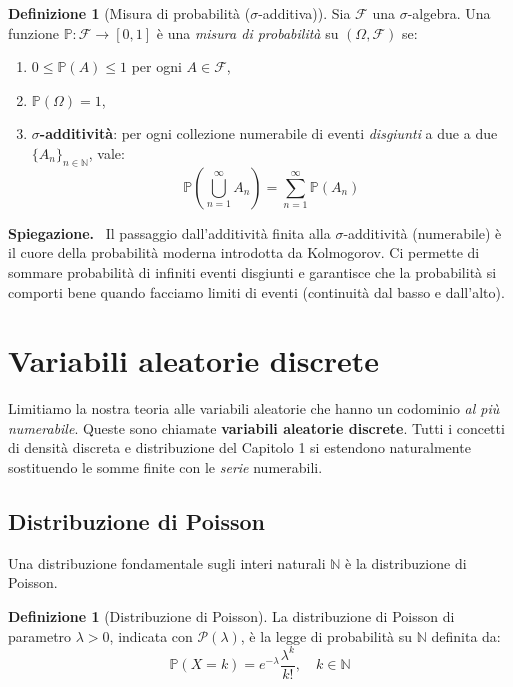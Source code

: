 \documentclass[11pt, a4paper]{report}
\theoremstyle{plain}
\theoremstyle{definition}
\newtheorem{definition}[theorem]{Definizione}
\theoremstyle{remark}
\newenvironment{spiegazione}[1][Spiegazione]
{\begin{mdframed}[backgroundcolor=green!5, linecolor=green!50, linewidth=2pt, topline=false, rightline=false, bottomline=false]
\textbf{\textsf{#1.}}\ }
{\end{mdframed}}
\newcommand{\PP}{\mathbb{P}}
\newcommand{\F}{\mathcal{F}}
\newcommand{\N}{\mathbb{N}}
\newcommand{\1}{\mathbf{1}}
\begin{document}
\begin{definition}[Misura di probabilità ($\sigma$-additiva)]
Sia $\F$ una $\sigma$-algebra. Una funzione $\PP : \F \to [0, 1]$ è una \emph{misura di probabilità} su $(\Omega, \F)$ se:
\begin{enumerate}
    \item $0 \le \PP(A) \le 1$ per ogni $A \in \F$,
    \item $\PP(\Omega) = 1$,
    \item \textbf{$\sigma$-additività}: per ogni collezione numerabile di eventi \emph{disgiunti} a due a due $\{A_n\}_{n \in \N}$, vale:
    \[ \PP\left(\bigcup_{n=1}^\infty A_n\right) = \sum_{n=1}^\infty \PP(A_n) \]
\end{enumerate}
\end{definition}

\begin{spiegazione}
    Il passaggio dall'additività finita alla $\sigma$-additività (numerabile) è il cuore della probabilità moderna introdotta da Kolmogorov. Ci permette di sommare probabilità di infiniti eventi disgiunti e garantisce che la probabilità si comporti bene quando facciamo limiti di eventi (continuità dal basso e dall'alto).
\end{spiegazione}

\section{Variabili aleatorie discrete}

Limitiamo la nostra teoria alle variabili aleatorie che hanno un codominio \emph{al più numerabile}. Queste sono chiamate \textbf{variabili aleatorie discrete}. Tutti i concetti di densità discreta e distribuzione del Capitolo 1 si estendono naturalmente sostituendo le somme finite con le \emph{serie} numerabili.

\subsection{Distribuzione di Poisson}

Una distribuzione fondamentale sugli interi naturali $\N$ è la distribuzione di Poisson.

\begin{definition}[Distribuzione di Poisson]
La distribuzione di Poisson di parametro $\lambda > 0$, indicata con $\mathcal{P}(\lambda)$, è la legge di probabilità su $\N$ definita da:
\[ \PP(X = k) = e^{-\lambda} \frac{\lambda^k}{k!}, \quad k \in \N \]
\end{definition}
\end{document}
